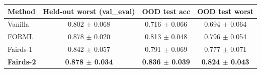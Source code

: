 \begin{tabular}{lccc}
\toprule
Method & Held-out worst (val\_eval) & OOD test acc & OOD test worst \\
\midrule
Vanilla & 0.802 $\pm$ 0.068 & 0.716 $\pm$ 0.066 & 0.694 $\pm$ 0.064 \\
FORML & 0.878 $\pm$ 0.020 & 0.813 $\pm$ 0.048 & 0.796 $\pm$ 0.054 \\
Fairds-1 & 0.842 $\pm$ 0.057 & 0.791 $\pm$ 0.069 & 0.777 $\pm$ 0.071 \\
\textbf{Fairds-2} & \textbf{0.878 $\pm$ 0.034} & \textbf{0.836 $\pm$ 0.039} & \textbf{0.824 $\pm$ 0.043} \\
\bottomrule
\end{tabular}